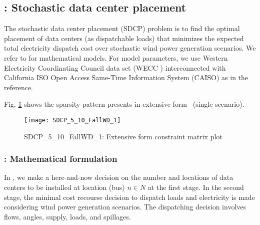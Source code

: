 \subsection{\sdcp: Stochastic data center placement} \label{SDCP}
The stochastic data center placement (SDCP) problem is to find the optimal placement of data centers (as dispatchable loads) that minimizes the expected total electricity dispatch cost over stochastic wind power generation scenarios. We refer to \cite{journal:KYZC2017} for mathematical models. For model parameters, we use Western Electricity Coordinating Council data set (WECC \cite{web:wecc}) interconnected with California ISO Open Access Same-Time Information System (CAISO) as in the reference. 

Fig. \ref{fig:sdcp_sparsity} shows the sparsity pattern presents in extensive form \sdcp\ (single scenario).
\begin{figure}[H]
	\centering
	\texttt{[image: SDCP\_5\_10\_FallWD\_1]}
	\caption{SDCP\_5\_10\_FallWD\_1: Extensive form constraint matrix plot}
	\label{fig:sdcp_sparsity}
\end{figure}

\subsubsection{\sdcp: Mathematical formulation}
In \sdcp, we make a here-and-now decision on the number and locations of data centers to be installed at location (bus) $n\in N$ at the first stage. In the second stage, the minimal cost recourse decision to dispatch loads and electricity is made considering wind power generation scenarios. The dispatching decision involves flows, angles, supply, loads, and spillages.

